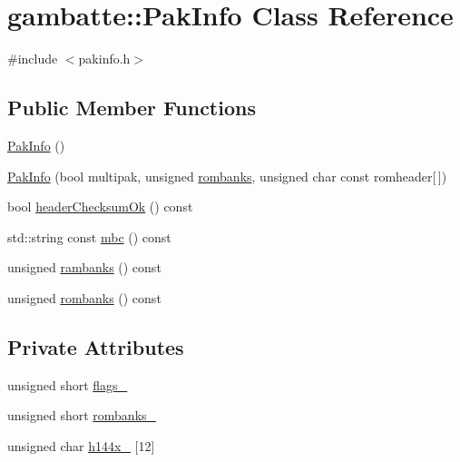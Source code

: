 \hypertarget{classgambatte_1_1PakInfo}{}\section{gambatte\+:\+:Pak\+Info Class Reference}
\label{classgambatte_1_1PakInfo}


{\ttfamily \#include $<$pakinfo.\+h$>$}

\subsection*{Public Member Functions}
\begin{DoxyCompactItemize}
\item 
\hyperlink{classgambatte_1_1PakInfo_afffeb4072ef8b2d6fc765165b27df465}{Pak\+Info} ()
\item 
\hyperlink{classgambatte_1_1PakInfo_a0452a9b584ddb7e8f8a31aee46c1f851}{Pak\+Info} (bool multipak, unsigned \hyperlink{classgambatte_1_1PakInfo_a65a29474a5687965c9a232efb0e1114a}{rombanks}, unsigned char const romheader\mbox{[}$\,$\mbox{]})
\item 
bool \hyperlink{classgambatte_1_1PakInfo_a653c25580c6c1b6403796f4808bf97f8}{header\+Checksum\+Ok} () const
\item 
std\+::string const \hyperlink{classgambatte_1_1PakInfo_a87a389c4b21174bf5b00786181710edb}{mbc} () const
\item 
unsigned \hyperlink{classgambatte_1_1PakInfo_aa9137e60d5bd20280ad65cc93c58fd8b}{rambanks} () const
\item 
unsigned \hyperlink{classgambatte_1_1PakInfo_a65a29474a5687965c9a232efb0e1114a}{rombanks} () const
\end{DoxyCompactItemize}
\subsection*{Private Attributes}
\begin{DoxyCompactItemize}
\item 
unsigned short \hyperlink{classgambatte_1_1PakInfo_a254d238fefb6204ec901906c56069237}{flags\+\_\+}
\item 
unsigned short \hyperlink{classgambatte_1_1PakInfo_a2ddb9141285fa0127c7a18f0919a45e5}{rombanks\+\_\+}
\item 
unsigned char \hyperlink{classgambatte_1_1PakInfo_ab8e8ac1b13d11e602d674255ca5af72e}{h144x\+\_\+} \mbox{[}12\mbox{]}
\end{DoxyCompactItemize}


